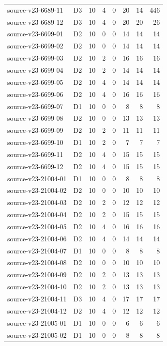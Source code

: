 \begin{longtable}{p{}lrrrrrr}
source-v23-6689-11 & D3 & 10 & 4 & 0 & 20 & 14 & 446\\
source-v23-6689-12 & D3 & 10 & 4 & 0 & 20 & 20 & 26\\
source-v23-6699-01 & D2 & 10 & 0 & 0 & 14 & 14 & 14\\
source-v23-6699-02 & D2 & 10 & 0 & 0 & 14 & 14 & 14\\
source-v23-6699-03 & D2 & 10 & 2 & 0 & 16 & 16 & 16\\
source-v23-6699-04 & D2 & 10 & 2 & 0 & 14 & 14 & 14\\
source-v23-6699-05 & D2 & 10 & 4 & 0 & 14 & 14 & 14\\
source-v23-6699-06 & D2 & 10 & 4 & 0 & 16 & 16 & 16\\
source-v23-6699-07 & D1 & 10 & 0 & 0 & 8 & 8 & 8\\
source-v23-6699-08 & D2 & 10 & 0 & 0 & 13 & 13 & 13\\
source-v23-6699-09 & D2 & 10 & 2 & 0 & 11 & 11 & 11\\
source-v23-6699-10 & D1 & 10 & 2 & 0 & 7 & 7 & 7\\
source-v23-6699-11 & D2 & 10 & 4 & 0 & 15 & 15 & 15\\
source-v23-6699-12 & D2 & 10 & 4 & 0 & 15 & 15 & 15\\
source-v23-21004-01 & D1 & 10 & 0 & 0 & 8 & 8 & 8\\
source-v23-21004-02 & D2 & 10 & 0 & 0 & 10 & 10 & 10\\
source-v23-21004-03 & D2 & 10 & 2 & 0 & 12 & 12 & 12\\
source-v23-21004-04 & D2 & 10 & 2 & 0 & 15 & 15 & 15\\
source-v23-21004-05 & D2 & 10 & 4 & 0 & 16 & 16 & 16\\
source-v23-21004-06 & D2 & 10 & 4 & 0 & 14 & 14 & 14\\
source-v23-21004-07 & D1 & 10 & 0 & 0 & 8 & 8 & 8\\
source-v23-21004-08 & D2 & 10 & 0 & 0 & 10 & 10 & 10\\
source-v23-21004-09 & D2 & 10 & 2 & 0 & 13 & 13 & 13\\
source-v23-21004-10 & D2 & 10 & 2 & 0 & 13 & 13 & 13\\
source-v23-21004-11 & D3 & 10 & 4 & 0 & 17 & 17 & 17\\
source-v23-21004-12 & D2 & 10 & 4 & 0 & 12 & 12 & 12\\
source-v23-21005-01 & D1 & 10 & 0 & 0 & 6 & 6 & 6\\
source-v23-21005-02 & D1 & 10 & 0 & 0 & 8 & 8 & 8\\

\end{longtable}
